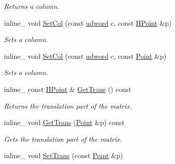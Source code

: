 \begin{DoxyCompactItemize}
\begin{DoxyCompactList}\small\item\em Returns a column. \end{DoxyCompactList}\item 
\hypertarget{class_matrix4x4_aac77ac4153ba1ddfc369bd93daeade2b}{inline\+\_\+ void \hyperlink{class_matrix4x4_aac77ac4153ba1ddfc369bd93daeade2b}{Set\+Col} (const \hyperlink{_ice_types_8h_a44c6f1920ba5551225fb534f9d1a1733}{udword} c, const \hyperlink{class_h_point}{H\+Point} \&p)}\label{class_matrix4x4_aac77ac4153ba1ddfc369bd93daeade2b}

\begin{DoxyCompactList}\small\item\em Sets a column. \end{DoxyCompactList}\item 
\hypertarget{class_matrix4x4_a8bb482e1520341e88d505698a6cdbb9e}{inline\+\_\+ void \hyperlink{class_matrix4x4_a8bb482e1520341e88d505698a6cdbb9e}{Set\+Col} (const \hyperlink{_ice_types_8h_a44c6f1920ba5551225fb534f9d1a1733}{udword} c, const \hyperlink{class_point}{Point} \&p)}\label{class_matrix4x4_a8bb482e1520341e88d505698a6cdbb9e}

\begin{DoxyCompactList}\small\item\em Sets a column. \end{DoxyCompactList}\item 
\hypertarget{class_matrix4x4_ab4fc37881fcbff8e7338a6ee88530fe3}{inline\+\_\+ const \hyperlink{class_h_point}{H\+Point} \& \hyperlink{class_matrix4x4_ab4fc37881fcbff8e7338a6ee88530fe3}{Get\+Trans} () const }\label{class_matrix4x4_ab4fc37881fcbff8e7338a6ee88530fe3}

\begin{DoxyCompactList}\small\item\em Returns the translation part of the matrix. \end{DoxyCompactList}\item 
\hypertarget{class_matrix4x4_a7850e5ba38a89cfcc9f4aae4c1108b37}{inline\+\_\+ void \hyperlink{class_matrix4x4_a7850e5ba38a89cfcc9f4aae4c1108b37}{Get\+Trans} (\hyperlink{class_point}{Point} \&p) const }\label{class_matrix4x4_a7850e5ba38a89cfcc9f4aae4c1108b37}

\begin{DoxyCompactList}\small\item\em Gets the translation part of the matrix. \end{DoxyCompactList}\item 
\hypertarget{class_matrix4x4_a6baf0a4d55ed572366ecc2d8022798a0}{inline\+\_\+ void \hyperlink{class_matrix4x4_a6baf0a4d55ed572366ecc2d8022798a0}{Set\+Trans} (const \hyperlink{class_point}{Point} \&p)}\label{class_matrix4x4_a6baf0a4d55ed572366ecc2d8022798a0}


\end{DoxyCompactItemize}
